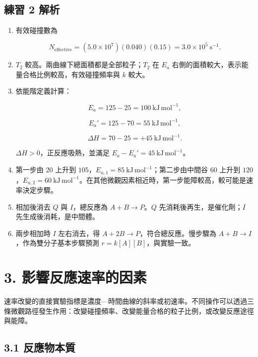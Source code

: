 \documentclass[11pt,a4paper]{article}
\begin{document}
\subsection{練習 2 解析}\label{ux7df4ux7fd2-2-ux89e3ux6790}

\begin{enumerate}
\def\labelenumi{\arabic{enumi}.}
\item
  有效碰撞數為

  \[
  N_{\mathrm{effective}}
  =(5.0\times10^7)(0.040)(0.15)
  =3.0\times10^5\ \mathrm{s^{-1}}.
  \]
\item
  \(T_2\) 較高。兩曲線下總面積都是全部粒子；\(T_2\) 在 \(E_a\) 右側的面積較大，表示能量合格比例較高，有效碰撞頻率與 \(k\) 較大。
\item
  依能階定義計算：

  \[
  E_a=125-25=100\ \mathrm{kJ\,mol^{-1}},
  \]

  \[
  E_a'=125-70=55\ \mathrm{kJ\,mol^{-1}},
  \]

  \[
  \Delta H=70-25=+45\ \mathrm{kJ\,mol^{-1}}.
  \]

  \(\Delta H>0\)，正反應吸熱，並滿足 \(E_a-E_a'=45\ \mathrm{kJ\,mol^{-1}}\)。
\item
  第一步由 \(20\) 上升到 \(105\)，\(E_{a,1}=85\ \mathrm{kJ\,mol^{-1}}\)；第二步由中間谷 \(60\) 上升到 \(120\)，\(E_{a,2}=60\ \mathrm{kJ\,mol^{-1}}\)。在其他微觀因素相近時，第一步能障較高，較可能是速率決定步驟。
\item
  相加後消去 \(Q\) 與 \(I\)，總反應為 \(A+B\rightarrow P\)。\(Q\) 先消耗後再生，是催化劑；\(I\) 先生成後消耗，是中間體。
\item
  兩步相加時 \(I\) 左右消去，得 \(A+2B\rightarrow P\)，符合總反應。慢步驟為 \(A+B\rightarrow I\)，作為雙分子基本步驟預測 \(r=k[A][B]\)，與實驗一致。
\end{enumerate}

\section{3. 影響反應速率的因素}\label{ux5f71ux97ffux53cdux61c9ux901fux7387ux7684ux56e0ux7d20}

速率改變的直接實驗指標是濃度---時間曲線的斜率或初速率。不同操作可以透過三條微觀路徑發生作用：改變碰撞頻率、改變能量合格的粒子比例，或改變反應途徑與能障。

\subsection{3.1 反應物本質}\label{ux53cdux61c9ux7269ux672cux8cea}
\end{document}
